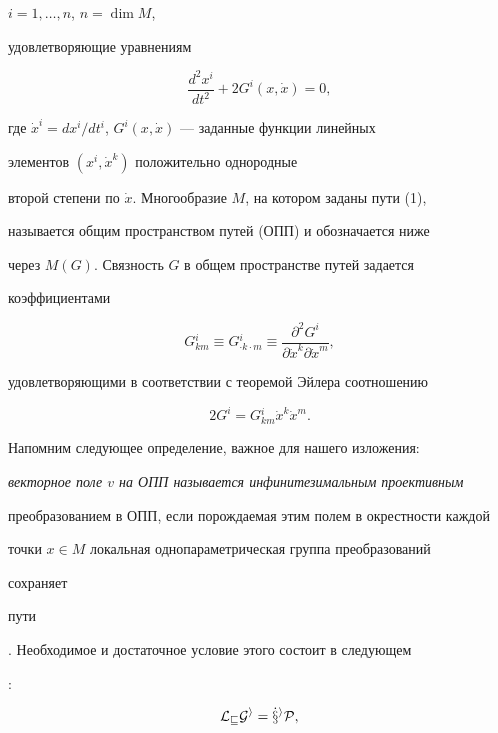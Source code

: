 $i=1,\dotsc,n$, $n=\dim M$, 


удовлетворяющие уравнениям 


\begin{equation} 


\frac{d^2x^i}{dt^2}+2G^i(x,\Dot x)=0, 


\end{equation} 


где $\Dot x^i=dx^i/dt^i$, $G^i(x,\Dot x)$ --- заданные функции линейных 


элементов $(x^i,\Dot x^k)$ положительно однородные 


второй степени по $\Dot x$. Многообразие $M$, на котором заданы пути (1), 


называется общим пространством путей (ОПП) \cite{Ru} и обозначается ниже 


через $M(G)$. Связность $G$ в общем пространстве путей задается 


коэффициентами 


\begin{equation} 


G{}^i_{km}\equiv G{}^i_{\cdot k\cdot m}\equiv 


\frac{\partial^2G^i}{\partial\Dot x^k\partial\Dot x^m}, 


\end{equation} 


удовлетворяющими в соответствии с теоремой Эйлера соотношению 


$$ 


2G^i=G{}^i_{km}\Dot x^k\Dot x^m. 


$$ 


 


Напомним следующее определение, важное для нашего изложения: 


{\em векторное поле $v$ на ОПП называется инфинитезимальным проективным 


преобразованием в ОПП, если порождаемая этим полем в окрестности каждой 


точки $x\in M$ локальная однопараметрическая группа преобразований 


сохраняет 


пути}. Необходимое и достаточное условие этого состоит в следующем 


\cite{Ru}: 


\begin{equation} 


\cal L_vG^i=\Dot x^iP, 


\end{equation} 



